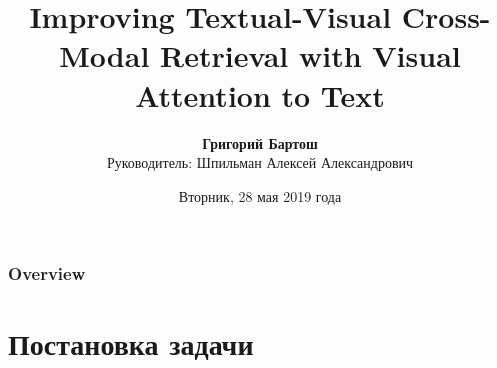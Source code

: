 \documentclass{beamer}
\title[Cross-Modal Retrieval]{Improving Textual-Visual Cross-Modal Retrieval with Visual Attention to Text}
\author[Григорий Бартош]{
	\textbf{Григорий Бартош}\\
	Руководитель: Шпильман Алексей Александрович
}
\institute[ВШЭ СПб]{НИУ ВШЭ СПб}
\date[28.05.2019]{Вторник, 28 мая 2019 года}
\begin{document}
	
\begin{frame}
	\titlepage
\end{frame}

\begin{frame}
	\frametitle{Overview}
	\tableofcontents
\end{frame}


\section{Постановка задачи}
\end{document}
